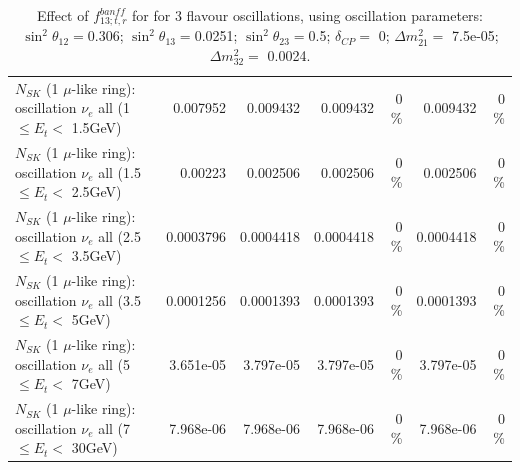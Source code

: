 \begin{table}
\begin{tabular}{| l | r | r | r  r | r  r |}
$N_{SK}$ (1 $\mu$-like ring): oscillation $\nu_{e}$ all (1 $\leq E_{t} <$ 1.5GeV) &        0.007952 &        0.009432 &        0.009432 &        0 \%  &        0.009432 &        0 \%  \\ 
$N_{SK}$ (1 $\mu$-like ring): oscillation $\nu_{e}$ all (1.5 $\leq E_{t} <$ 2.5GeV) &         0.00223 &        0.002506 &        0.002506 &        0 \%  &        0.002506 &        0 \%  \\ 
$N_{SK}$ (1 $\mu$-like ring): oscillation $\nu_{e}$ all (2.5 $\leq E_{t} <$ 3.5GeV) &       0.0003796 &       0.0004418 &       0.0004418 &        0 \%  &       0.0004418 &        0 \%  \\ 
$N_{SK}$ (1 $\mu$-like ring): oscillation $\nu_{e}$ all (3.5 $\leq E_{t} <$ 5GeV) &       0.0001256 &       0.0001393 &       0.0001393 &        0 \%  &       0.0001393 &        0 \%  \\ 
 $N_{SK}$ (1 $\mu$-like ring): oscillation $\nu_{e}$ all (5 $\leq E_{t} <$ 7GeV) &       3.651e-05 &       3.797e-05 &       3.797e-05 &        0 \%  &       3.797e-05 &        0 \%  \\ 
$N_{SK}$ (1 $\mu$-like ring): oscillation $\nu_{e}$ all (7 $\leq E_{t} <$ 30GeV) &       7.968e-06 &       7.968e-06 &       7.968e-06 &        0 \%  &       7.968e-06 &        0 \%  \\ 
\hline
\hline
\end{tabular}
\caption{ Effect of $f_{13; t, r}^{banff}$ for for 3 flavour oscillations, using oscillation parameters:  $\sin^2\theta_{12} = $0.306; $\sin^2\theta_{13} = $0.0251; $\sin^2\theta_{23} = $0.5; $\delta_{CP} = $        0; $\Delta m^2_{21} = $    7.5e-05; $\Delta m^2_{32} = $    0.0024. }
\label{tab:num_banff_13_1RmuT_3f_osc_t13:0.0251}
\end{table}
\clearpage
